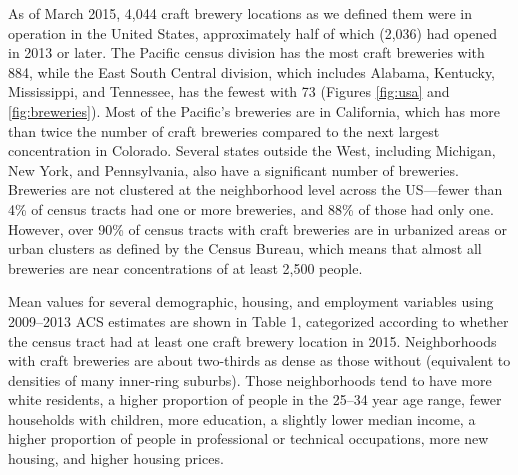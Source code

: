 \documentclass[]{article}
\begin{document}
As of March 2015, 4,044 craft brewery locations as we defined them were
in operation in the United States, approximately half of which (2,036)
had opened in 2013 or later. The Pacific census division has the most
craft breweries with 884, while the East South Central division, which
includes Alabama, Kentucky, Mississippi, and Tennessee, has the fewest
with 73 (Figures \ref{fig:usa} and \ref{fig:breweries}). Most of the Pacific's breweries are in
California, which has more than twice the number of craft breweries
compared to the next largest concentration in Colorado. Several states
outside the West, including Michigan, New York, and Pennsylvania, also
have a significant number of breweries. Breweries are not clustered at
the neighborhood level across the US---fewer than 4\% of census tracts
had one or more breweries, and 88\% of those had only one. However, over
90\% of census tracts with craft breweries are in urbanized areas or
urban clusters as defined by the Census Bureau, which means that almost
all breweries are near concentrations of at least 2,500 people.

Mean values for several demographic, housing, and employment variables
using 2009--2013 ACS estimates are shown in Table 1, categorized
according to whether the census tract had at least one craft brewery
location in 2015. Neighborhoods with craft breweries are about
two-thirds as dense as those without (equivalent to densities of many
inner-ring suburbs). Those neighborhoods tend to have more white
residents, a higher proportion of people in the 25--34 year age range,
fewer households with children, more education, a slightly lower median
income, a higher proportion of people in professional or technical
occupations, more new housing, and higher housing prices.
\end{document}

